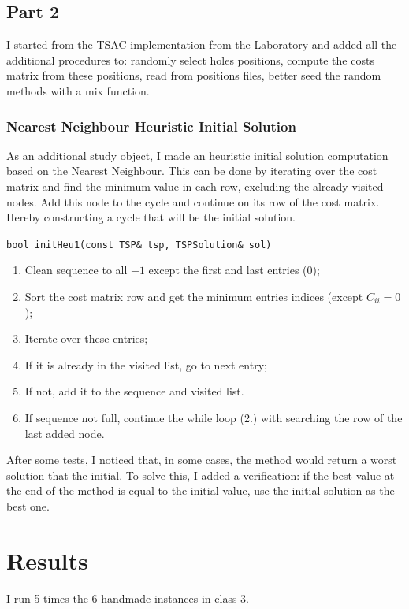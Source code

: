 \documentclass[a4paper,12pt]{article}
\begin{document}
		\subsection{Part 2}

			I started from the TSAC implementation from the Laboratory and added all the additional procedures to: randomly select holes positions, compute the costs matrix from these positions, read from positions files, better seed the random methods with a mix function.
			
			\subsubsection{Nearest Neighbour Heuristic Initial Solution}
				As an additional study object, I made an heuristic initial solution computation based on the Nearest Neighbour.
				This can be done by iterating over the cost matrix and find the minimum value in each row, excluding the already visited nodes.
				Add this node to the cycle and continue on its row of the cost matrix.
				Hereby constructing a cycle that will be the initial solution.
				
				\texttt{bool initHeu1(const TSP\& tsp, TSPSolution\& sol)}
				\begin{enumerate}
					\item Clean sequence to all $ -1 $ except the first and last entries ($ 0 $);
					\item Sort the cost matrix row and get the minimum entries indices (except $C_{ii} = 0$);
					\item Iterate over these entries;
					\item If it is already in the visited list, go to next entry;
					\item If not, add it to the sequence and visited list.
					\item If sequence not full, continue the while loop (2.) with searching the row of the last added node. 
				\end{enumerate}
			
			
			After some tests, I noticed that, in some cases, the method would return a worst solution that the initial.
			To solve this, I added a verification: if the best value at the end of the method is equal to the initial value, use the initial solution as the best one.
			
					
	\section{Results}
		I run 5 times the 6 handmade instances in class 3. 
		
\end{document}
